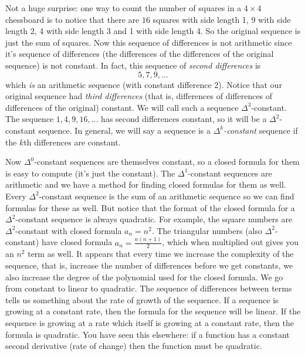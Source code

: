 \documentclass[10pt,]{book}
\theoremstyle{plain}
\theoremstyle{definition}
\theoremstyle{definition}
\theoremstyle{definition}
\numberwithin{equation}{chapter}
\begin{document}
Not a huge surprise: one way to count the number of squares in a \(4 \times 4\) chessboard is to notice that there are \(16\) squares with side length 1, 9 with side length 2, 4 with side length 3 and 1 with side length 4. So the original sequence is just the sum of squares. Now this sequence of differences is not arithmetic since it's sequence of differences (the differences of the differences of the original sequence) is not constant. In fact, this sequence of \emph{second differences} is
\begin{equation*}
  5, 7, 9, \ldots
\end{equation*}
which \emph{is} an arithmetic sequence (with constant difference 2). Notice that our original sequence had \emph{third differences} (that is, differences of differences of differences of the original) constant. We will call such a sequence \(\Delta^3\)-constant. The sequence \(1, 4, 9, 16, \ldots\) has second differences constant, so it will be a \(\Delta^2\)-constant sequence. In general, we will say a sequence is a \emph{\(\Delta^k\)-constant}\label{notation-10}
 sequence if the \(k\)th differences are constant.
%
\par

Now \(\Delta^0\)-constant sequences are themselves constant, so a closed formula for them is easy to compute (it's just the constant). The \(\Delta^1\)-constant sequences are arithmetic and we have a method for finding closed formulas for them as well. Every \(\Delta^2\)-constant sequence is the sum of an arithmetic sequence so we can find formulas for these as well. But notice that the format of the closed formula for a \(\Delta^2\)-constant sequence is always quadratic. For example, the square numbers are \(\Delta^2\)-constant with closed formula \(a_n= n^2\). The triangular numbers (also \(\Delta^2\)-constant) have closed formula \(a_n = \frac{n(n+1)}{2}\), which when multiplied out gives you an \(n^2\) term as well. It appears that every time we increase the complexity of the sequence, that is, increase the number of differences before we get constants, we also increase the degree of the polynomial used for the closed formula. We go from constant to linear to quadratic. The sequence of differences between terms tells us something about the rate of growth of the sequence. If a sequence is growing at a constant rate, then the formula for the sequence will be linear. If the sequence is growing at a rate which itself is growing at a constant rate, then the formula is quadratic. You have seen this elsewhere: if a function has a constant second derivative (rate of change) then the function must be quadratic.
%
\par
\end{document}
